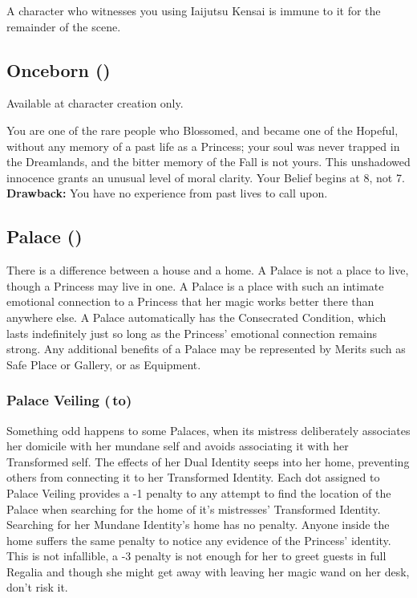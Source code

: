 A character who witnesses you using Iaijutsu Kensai is immune to it for the remainder of the scene. 

\subsection*{Onceborn (\textbullet\textbullet\textbullet)}

Available at character creation only.

You are one of the rare people who Blossomed, and became one of the Hopeful, without any memory of a past life as a Princess; your soul was never trapped in the Dreamlands, and the bitter memory of the Fall is not yours. This unshadowed innocence grants an unusual level of moral clarity. Your Belief begins at 8, not 7.\\

\noindent\textbf{Drawback:} You have no experience from past lives to call upon. 

\subsection*{Palace (\textbullet)}

There is a difference between a house and a home. A Palace is not a place to live, though a Princess may live in one. A Palace is a place with such an intimate emotional connection to a Princess that her magic works better there than anywhere else. A Palace automatically has the Consecrated Condition, which lasts indefinitely just so long as the Princess' emotional connection remains strong. Any additional benefits of a Palace may be represented by Merits such as Safe Place or Gallery, or as Equipment. 

\subsubsection*{Palace Veiling (\textbullet\,\nobreak\hspace{.16667em}to\nobreak\hspace{.16667em}\textbullet\textbullet\textbullet)}

Something odd happens to some Palaces, when its mistress deliberately associates her domicile with her mundane self and avoids associating it with her Transformed self. The effects of her Dual Identity seeps into her home, preventing others from connecting it to her Transformed Identity. Each dot assigned to Palace Veiling provides a -1 penalty to any attempt to find the location of the Palace when searching for the home of it's mistresses' Transformed Identity. Searching for her Mundane Identity's home has no penalty. Anyone inside the home suffers the same penalty to notice any evidence of the Princess' identity. This is not infallible, a -3 penalty is not enough for her to greet guests in full Regalia and though she might get away with leaving her magic wand on her desk, don't risk it. 

